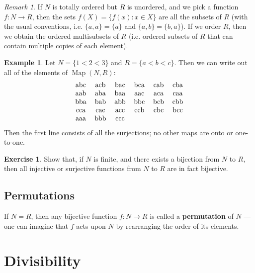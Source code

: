 \documentclass[a4paper,leqno]{article}
\numberwithin{equation}{section}
\theoremstyle{definition}
\newtheorem{ex}[equation]{Example}
\newtheorem{exercise}[equation]{Exercise}
\theoremstyle{remark}
\newtheorem{rem}[equation]{Remark}
\newcommand{\df}[1]{\textbf{#1}}
\DeclareMathOperator{\Map}{Map}
\begin{document}
\begin{rem}
  If $ N $ is totally ordered but $ R $ is unordered, and we pick a function $ f : N \to R $, then the sets $ f(X) = \{f(x) : x \in X\} $ are
  all the subsets of $ R $ (with the usual conventions, i.e. $ \{a, a\} = \{a\} $ and $ \{a,b\} = \{b,a\} $). If we order $ R $, then we obtain
  the ordered multisubsets of $ R $ (i.e. ordered subsets of $ R $ that can contain multiple copies of each element).
\end{rem}

\begin{ex}
  Let $ N = \{1 < 2 < 3\} $ and $ R = \{a < b < c\} $. Then we can write out all of the elements of $ \Map(N,R) $:
  \begin{displaymath}
  \begin{tabular}{cccccc}
    abc & acb & bac & bca & cab & cba\\
    aab & aba & baa & aac & aca & caa\\
    bba & bab & abb & bbc & bcb & cbb\\
    cca & cac & acc & ccb & cbc & bcc\\
    aaa & bbb & ccc &     &     &
  \end{tabular}
  \end{displaymath}
  Then the first line consists of all the surjections; no other maps are onto or one-to-one.
\end{ex}

\begin{exercise}
  Show that, if $ N $ is finite, and there exists a bijection from $ N $ to $ R $, then all injective or surjective functions
  from $ N $ to $ R $ are in fact bijective.
\end{exercise}

\subsection{Permutations}
If $ N = R $, then any bijective function $ f : N \to R $ is called a \df{permutation} of $ N $ --- one can imagine that $ f $ acts
upon $ N $ by rearranging the order of its elements.

\section{Divisibility}
\end{document}

